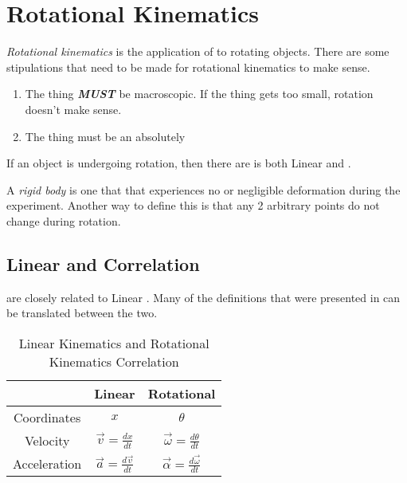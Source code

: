 \section{Rotational Kinematics}\label{sec:Rotational Kinematics}
\begin{definition}\label{def:Rotational Kinematics}
  \emph{Rotational kinematics} is the application of  to rotating objects.
  There are some stipulations that need to be made for rotational kinematics to make sense.

  \begin{enumerate}
    \item The thing \textbf{\emph{MUST}} be macroscopic. If the thing gets too small, rotation doesn't make sense.
    \item The thing must be an absolutely 
  \end{enumerate}

  If an object is undergoing rotation, then there are is both Linear  and .
\end{definition}

\begin{definition}\label{def:Rigid Body}
  A \emph{rigid body} is one that that experiences no or negligible deformation during the experiment.
  Another way to define this is that any 2 arbitrary points do not change during rotation.
\end{definition}

\subsection{Linear  and  Correlation}\label{subsec:Linear Kinematics Rotational Kinematics Correlation}
 are closely related to Linear .
Many of the definitions that were presented in  can be translated between the two.

\begin{table}[h!] %
  \centering
  \renewcommand{\arraystretch}{1.4} %
  \begin{tabular}{ccc}
     & Linear & Rotational \\ \hline
    Coordinates & $x$ & $\theta$ \\ \hline
    Velocity & $\vec{v} = \frac{dx}{dt}$ & $\vec{\omega} = \frac{d \theta}{dt}$ \\ \hline
    Acceleration & $\vec{a} = \frac{d \vec{v}}{dt}$ & $\vec{\alpha} = \frac{d \vec{\omega}}{dt}$ \\ \hline
  \end{tabular}
  \caption{Linear Kinematics and Rotational Kinematics Correlation}
 \label{tab:Linear Kinematics Rotational Kinematics Correlation}
\end{table}

